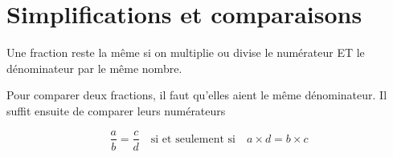 \section{Simplifications et comparaisons}

{Une fraction reste la même si on multiplie ou divise le numérateur ET le dénominateur par le même nombre.}




\vspace*{-1em}

{Pour comparer deux fractions, il faut qu'elles aient le même dénominateur. Il suffit ensuite de comparer leurs numérateurs}


{$$\dfrac{a}{b}=\dfrac{c}{d} \text{~~~si et seulement si~~~} a\times d = b\times c $$}

